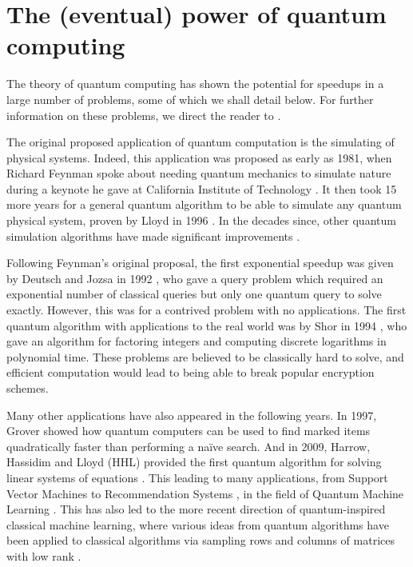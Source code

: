\section{The (eventual) power of quantum computing}
\label{sec:eventual-power}

The theory of quantum computing has shown the potential for speedups in a large number of problems, some of which we shall detail below. For further information on these problems, we direct the reader to \cite{montanaro2016}.

The original proposed application of quantum computation is the simulating of physical systems. Indeed, this application was proposed as early as 1981, when Richard Feynman spoke about needing quantum mechanics to simulate nature during a keynote he gave at California Institute of Technology \cite{feynman1982}. It then took 15 more years for a general quantum algorithm to be able to simulate any quantum physical system, proven by Lloyd in 1996 \cite{lloyd1996}. In the decades since, other quantum simulation algorithms have made significant improvements \cite{berry2015, berry2015stoc, low2017}.

Following Feynman's original proposal, the first exponential speedup was given by Deutsch and Jozsa in 1992 \cite{deutsch1992}, who gave a query problem which required an exponential number of classical queries but only one quantum query to solve exactly. However, this was for a contrived problem with no applications. The first quantum algorithm with applications to the real world was by Shor in 1994 \cite{shor1994}, who gave an algorithm for factoring integers and computing discrete logarithms in polynomial time. These problems are believed to be classically hard to solve, and efficient computation would lead to being able to break popular encryption schemes\cite{katz2007}.

Many other applications have also appeared in the following years. In 1997, Grover \cite{grover96} showed how quantum computers can be used to find marked items quadratically faster than performing a na\"ive search. And in 2009, Harrow, Hassidim and Lloyd (HHL) provided the first quantum algorithm for solving linear systems of equations \cite{harrow2009}. This leading to many applications, from Support Vector Machines \cite{rebentrost2014} to Recommendation Systems \cite{kerenidis2017}, in the field of Quantum Machine Learning \cite{wittek2014, schuld2014, adcock2015, biamonte2017}. This has also led to the more recent direction of quantum-inspired classical machine learning, where various ideas from quantum algorithms have been applied to classical algorithms via sampling rows and columns of matrices with low rank \cite{tang2019, tang2018, gilyen2018, arrazola2019, chia2019, jethwani2019}.

